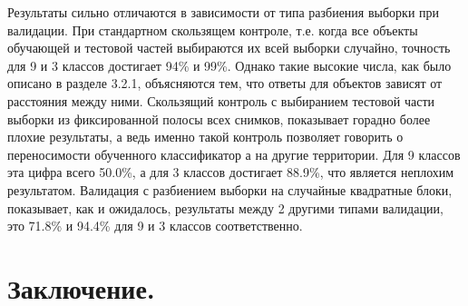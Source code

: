 \documentclass[14pt]{extarticle}
\begin{document}
Результаты сильно отличаются в зависимости от типа разбиения выборки при валидации.
При стандартном скользящем контроле, т.е. когда все объекты обучающей и тестовой частей
выбираются их всей выборки случайно, точность для 9 и 3 классов достигает 94\% и 99\%.
Однако такие высокие числа, как было описано в разделе 3.2.1, объясняются тем, что ответы
для объектов зависят от расстояния между ними. Скользящий контроль с выбиранием тестовой части
выборки из фиксированной полосы всех снимков, показывает горадно более плохие результаты, а 
ведь именно такой контроль позволяет говорить о переносимости обученного классификатор а на 
другие территории. Для 9 классов эта цифра всего 50.0\%, а для 3 классов достигает
88.9\%, что является неплохим результатом. Валидация с разбиением выборки на 
случайные квадратные блоки, показывает, как и ожидалось, результаты между
2 другими типами валидации, это 71.8\% и 94.4\% для 9 и 3 классов соответственно.

\section{Заключение.}
\end{document}
